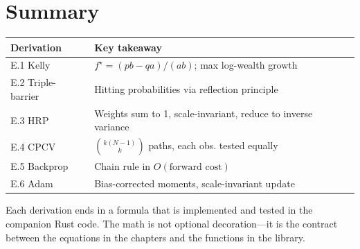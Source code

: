 \section{Summary}

\begin{center}
\begin{tabular}{lp{8cm}}
\toprule
\textbf{Derivation} & \textbf{Key takeaway} \\
\midrule
E.1 Kelly & $f^\star = (p b - q a) / (a b)$; max log-wealth growth \\
E.2 Triple-barrier & Hitting probabilities via reflection principle \\
E.3 HRP & Weights sum to 1, scale-invariant, reduce to inverse variance \\
E.4 CPCV & $\binom{k(N-1)}{k}$ paths, each obs. tested equally \\
E.5 Backprop & Chain rule in $O(\text{forward cost})$ \\
E.6 Adam & Bias-corrected moments, scale-invariant update \\
\bottomrule
\end{tabular}
\end{center}

Each derivation ends in a formula that is implemented and tested in
the companion Rust code. The math is not optional decoration---it is
the contract between the equations in the chapters and the functions
in the library.